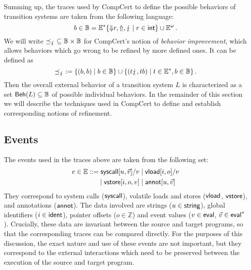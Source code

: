 \documentclass[acmsmall,review,anonymous]{acmart}\settopmatter{printfolios=true,printccs=false,printacmref=false}
\begin{document}
Summing up,
the traces used by CompCert to define
the possible behaviors of transition systems
are taken from the following language:
\[
  b \in \mathbb{B} =
    \mathbb{E}^*
      \{ {\Downarrow} r, {\Uparrow}, {\lightning} \mid r \in  \mathsf{int}  \}
      \cup
    \mathbb{E}^\omega
  \,.
\]
We will write
${\preceq_\lightning} \subseteq \mathbb{B} \times \mathbb{B}$
for CompCert's notion of \emph{behavior improvement},
which allows behaviors which go wrong to
be refined by more defined ones.
It can be defined as
\[
  {\preceq_\lightning} := \{ (b, b) \mid b \in \mathbb{B} \}
    \cup \{ (t \lightning, t b) \mid
            t \in \mathbb{E}^*, b \in \mathbb{B} \}
  \,.
\]
Then the overall external behavior
of a transition system $L$
is characterized
as a set $ \mathsf{Beh} (L) \subseteq \mathbb{B}$
of possible individual behaviors.
In the remainder of this section we will describe
the techniques used in CompCert to define and establish
corresponding notions of refinement.



\subsection{Events} %

The events used in the traces above are taken from the following set:
\begin{align*}
  e \in \mathbb{E} ::=
     \mathsf{syscall} [u, \vec{v}]/v & \mid
     \mathsf{vload} [i, o]/v \\ \mid
     \mathsf{vstore} [i, o, v] & \mid
     \mathsf{annot} [u, \vec{v}]
\end{align*}
They correspond to system calls ($ \mathsf{syscall} $),
volatile loads and stores ($ \mathsf{vload} $, $ \mathsf{vstore} $),
and annotations ($ \mathsf{annot} $).
The data involved
are strings ($u \in  \mathsf{string} $),
global identifiers ($i \in  \mathsf{ident} $),
pointer offsets ($o \in \mathbb{Z}$) and
event values ($v \in  \mathsf{eval} $, $\vec{v} \in  \mathsf{eval} ^*$).
Crucially,
these data are invariant between the source and target programs,
so that the corresponding traces can be compared directly.
For the purposes of this discussion,
the exact nature and use of these events
are not important,
but they correspond to the external interactions
which need to be preserved between the execution
of the source and target program.
\end{document}
